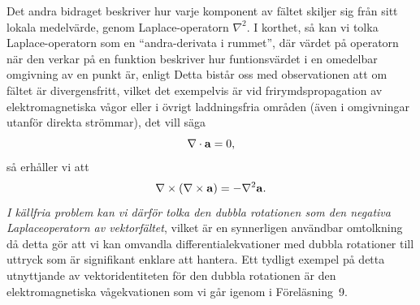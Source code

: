 Det andra bidraget beskriver hur varje komponent av f{\"a}ltet skiljer sig
fr{\aa}n sitt lokala medel\-v{\"a}rde,
genom Laplace-operatorn $\nabla^2$.
I korthet, s{\aa} kan vi tolka Laplace-operatorn som en ``andra-derivata i
rummet'', d{\"a}r v{\"a}rdet p{\aa} operatorn n{\"a}r den verkar p{\aa} en
funktion beskriver hur funtionsv{\"a}rdet i en omedelbar omgivning av en punkt
{\"a}r, enligt
Detta bist{\aa}r oss med observationen att om f{\"a}ltet {\"a}r divergensfritt,
vilket det exempelvis {\"a}r vid frirymdspropagation av elektromagnetiska
v{\aa}gor eller i {\"o}vrigt laddningsfria omr{\aa}den ({\"a}ven i omgivningar
utanf{\"o}r direkta str{\"o}mmar), det vill s{\"a}ga
$$
  \nabla\cdot{\bf a}=0,
$$
s{\aa} erh{\aa}ller vi att
$$
  \nabla\times(\nabla\times{\bf a})=-\nabla^2{\bf a}.
$$
{\it I k{\"a}llfria problem kan vi d{\"a}rf{\"o}r tolka den dubbla rotationen
som den negativa Laplaceoperatorn av vektorf{\"a}ltet}, vilket {\"a}r en
synnerligen anv{\"a}ndbar omtolkning d{\aa} detta  g{\"o}r att vi kan omvandla
differentialekvationer med dubbla rotationer till uttryck som {\"a}r
signifikant enklare att hantera.
Ett tydligt exempel p{\aa} detta utnyttjande av vektoridentiteten f{\"o}r den
dubbla rotationen {\"a}r den elektromagnetiska v{\aa}gekvationen som vi g{\aa}r
igenom i F{\"o}rel{\"a}sning~9.
\vfill\eject

